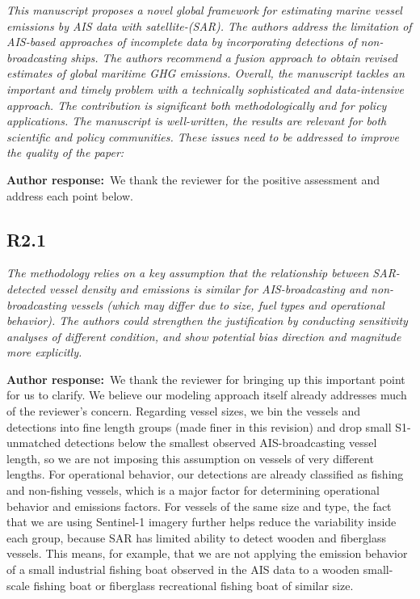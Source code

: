 \documentclass[11pt]{article}
\newcommand{\point}[1]{\subsection*{\normalfont\bfseries #1}}
\newcommand{\response}{\par\medskip\noindent%
  \textbf{\textcolor{respblue}{Author response:}}\ }
\begin{document}
\begin{refquote}\itshape
This manuscript proposes a novel global framework for estimating marine vessel
emissions by AIS data with satellite-(SAR). The authors address the limitation
of AIS-based approaches of incomplete data by incorporating detections of
non-broadcasting ships. The authors recommend a fusion approach to obtain
revised estimates of global maritime GHG emissions. Overall, the manuscript
tackles an important and timely problem with a technically sophisticated and
data-intensive approach. The contribution is significant both methodologically
and for policy applications. The manuscript is well-written, the results are
relevant for both scientific and policy communities. These issues need to be
addressed to improve the quality of the paper:
\end{refquote}

\response We thank the reviewer for the positive assessment and address each
point below.

\point{R2.1}

\begin{refquote}\itshape
The methodology relies on a key assumption that the relationship between
SAR-detected vessel density and emissions is similar for AIS-broadcasting and
non-broadcasting vessels (which may differ due to size, fuel types and
operational behavior). The authors could strengthen the justification by
conducting sensitivity analyses of different condition, and show potential bias
direction and magnitude more explicitly.
\end{refquote}

\response We thank the reviewer for bringing up this important point for us to clarify. We believe our modeling approach itself already addresses much of the reviewer's concern. Regarding vessel sizes, we bin the vessels and detections into fine length groups (made finer in this revision) and drop small S1-unmatched detections below the smallest observed AIS-broadcasting vessel length, so we are not imposing this assumption on vessels of very different lengths. For operational behavior, our detections are already classified as fishing and non-fishing vessels, which is a major factor for determining operational behavior and emissions factors. For vessels of the same size and type, the fact that we are using Sentinel-1 imagery further helps reduce the variability inside each group, because SAR has limited ability to detect wooden and fiberglass vessels. This means, for example, that we are not applying the emission behavior of a small industrial fishing boat observed in the AIS data to a wooden small-scale fishing boat or fiberglass recreational fishing boat of similar size.
\end{document}
